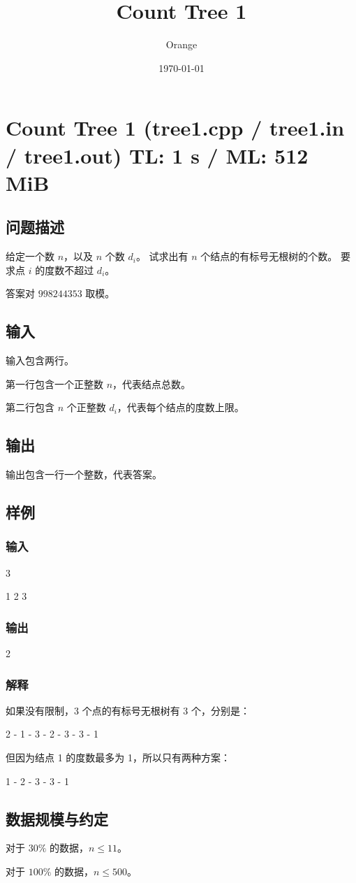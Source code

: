 \documentclass[UTF8]{article}
\title{Count Tree 1}
\author{Orange}
\date{\today}
\begin{document}
	\heiti

	\section{Count Tree 1 \small(tree1.cpp / tree1.in / tree1.out) TL: 1 s / ML: 512 MiB}
	\subsection{问题描述}
	给定一个数 $n$，以及 $n$ 个数 $d_i$。
	试求出有 $n$ 个结点的有标号无根树的个数。
	要求点 $i$ 的度数不超过 $d_i$。

	答案对 $998244353$ 取模。

	\subsection{输入}
	输入包含两行。

	第一行包含一个正整数 $n$，代表结点总数。

	第二行包含 $n$ 个正整数 $d_i$，代表每个结点的度数上限。

	\subsection{输出}
	输出包含一行一个整数，代表答案。

	\subsection{样例}
	\subsubsection{输入}
	3

	1 2 3

	\subsubsection{输出}
	2

	\subsubsection{解释}
	如果没有限制，3 个点的有标号无根树有 3 个，分别是：
	\begin{center}
		2 - 1 - 3  - 2 - 3  - 3 - 1
	\end{center}

	但因为结点 1 的度数最多为 1，所以只有两种方案：
	\begin{center}
		1 - 2 - 3  - 3 - 1
	\end{center}

	\subsection{数据规模与约定}
	对于 $30\%$ 的数据，$n \le 11$。

	对于 $100\%$ 的数据，$n \le 500$。
\end{document}
